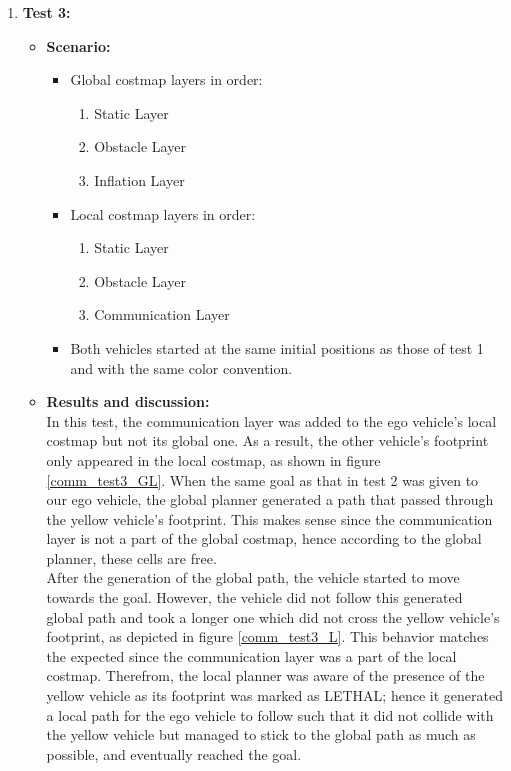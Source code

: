 \begin{itemize}
\begin{enumerate}
\begin{itemize}
            \end{itemize}
        \item \textbf{Test 3:}
            \begin{itemize}
                \item \textbf{Scenario:}
                \begin{itemize}
                    \item Global costmap layers in order:
                \begin{enumerate}
                    \item Static Layer
                    \item Obstacle Layer
                    \item Inflation Layer
                \end{enumerate}
                    \item Local costmap layers in order:
                \begin{enumerate}
                    \item Static Layer
                    \item Obstacle Layer
                    \item Communication Layer
                \end{enumerate}
                    \item Both vehicles started at the same initial positions as those of test 1 and with the same color convention.
                \end{itemize}
                \item \textbf{Results and discussion:} \\
                In this test, the communication layer was added to the ego vehicle’s local costmap but not its global one. As a result, the other vehicle’s footprint only appeared in the local costmap, as shown in figure \ref{comm_test3_GL}. When the same goal as that in test 2 was given to our ego vehicle, the global planner generated a path that passed through the yellow vehicle’s footprint. This makes sense since the communication layer is not a part of the global costmap, hence according to the global planner, these cells are free. \\ 
                
                After the generation of the global path, the vehicle started to move towards the goal. However, the vehicle did not follow this generated global path and took a longer one which did not cross the yellow vehicle's footprint, as depicted in figure \ref{comm_test3_L}. This behavior matches the expected since the communication layer was a part of the local costmap. Therefrom, the local planner was aware of the presence of the yellow vehicle as its footprint was marked as LETHAL; hence it generated a local path for the ego vehicle to follow such that it did not collide with the yellow vehicle but managed to stick to the global path as much as possible, and eventually reached the goal.


\end{itemize}
\end{enumerate}
\end{itemize}
